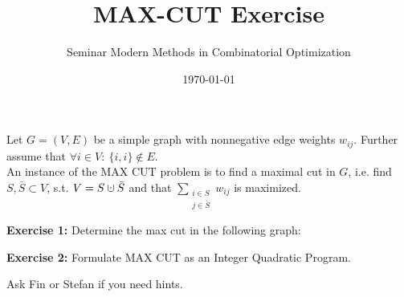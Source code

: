 \documentclass[a4paper]{scrartcl}
\title{MAX-CUT Exercise}
\subtitle{Seminar Modern Methods in Combinatorial Optimization}
\date{\today}
\newcommand{\cupdot}{\mathbin{\mathaccent\cdot\cup}}
\theoremstyle{plain}
\begin{document}
\maketitle
\noindent
Let $G=(V,E)$ be a simple graph with nonnegative edge weights $w_{ij}$. Further assume that $\forall i \in V: \ \{i,i\} \notin E.$\\
An instance of the MAX CUT problem is to find a maximal cut in $G$, i.e. find $S, \bar S \subset V$, s.t. $V = S \cupdot \bar S$ and that
$\sum_{\substack{i\in S \\ j \in\bar S}} w_{ij}$
 is maximized.
 \bigskip

\textbf{Exercise 1:}
Determine the max cut in the following graph:
\vspace{200pt}

\textbf{Exercise 2:}
Formulate MAX CUT as an Integer Quadratic Program.

\bigskip
\noindent
Ask Fin or Stefan if you need hints.
\end{document}
